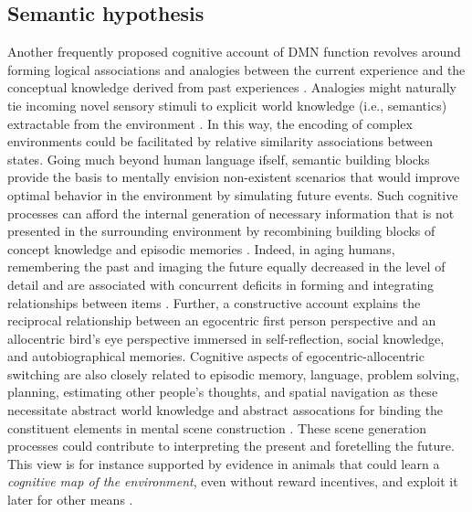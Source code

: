 \documentclass[10pt,letterpaper]{article}
\begin{document}
\subsection{Semantic hypothesis}
Another frequently proposed cognitive account of DMN function revolves
around forming logical associations and analogies between
the current experience and
the conceptual knowledge derived from past experiences
\citep{bar2007proactive, binder1999conceptual}.
Analogies might naturally tie incoming novel sensory stimuli to
explicit world knowledge (i.e., semantics) extractable from the environment
\citep{bar2009proactive}.
In this way, the encoding of complex environments could be facilitated
by relative similarity associations between states.
%
Going much beyond human language ifself,
semantic building blocks provide the basis to
mentally envision non-existent scenarios
that would improve optimal behavior in the environment
by simulating future events.
Such cognitive processes can afford
the internal generation of necessary information
that is not presented in the surrounding environment
by recombining building blocks of
concept knowledge and episodic memories
\citep{hassabis2009construction}.
Indeed, in aging humans, remembering the past and imaging the future
equally decreased in the level of detail and are associated with
concurrent deficits in forming and integrating relationships between
items \citep{addis2008age, spreng2006temporal}.
Further,
a constructive account explains the reciprocal relationship
between an egocentric first person perspective and
an allocentric bird’s eye perspective immersed in
self-reflection, social knowledge, and autobiographical memories.
%
Cognitive aspects of egocentric-allocentric switching
are also closely related to episodic memory, language, problem solving,
planning, estimating other people's thoughts, and spatial navigation
as these necessitate abstract world knowledge and abstract assocations
for binding the constituent elements in mental scene construction
\citep{schacter2007remembering}.
These scene generation processes could contribute to interpreting the
present and foretelling the future.
This view is for instance supported by evidence in animals that
could learn a \textit{cognitive map of the environment},
even without reward incentives, and exploit it later
for other means \citep{tolman1948cognitive}.
\end{document}
